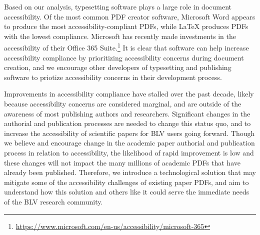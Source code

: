 Based on our analysis, typesetting software plays a large role in document accessibility. Of the most common PDF creator software, Microsoft Word appears to produce the most accessibility-compliant PDFs, while LaTeX produces PDFs with the lowest compliance. Microsoft has recently made investments in the accessibility of their Office 365 Suite.\footnote{\href{https://www.microsoft.com/en-us/accessibility/microsoft-365}{https://www.microsoft.com/en-us/accessibility/microsoft-365}} It is clear that software can help increase accessibility compliance by prioritizing accessibility concerns during document creation, and we encourage other developers of typesetting and publishing software to priotize accessibility concerns in their development process. 

Improvements in accessibility compliance have stalled over the past decade, likely because accessibility concerns are considered marginal, and are outside of the awareness of most publishing authors and researchers. Significant changes in the authorial and publication processes are needed to change this status quo, and to increase the accessibility of scientific papers for BLV users going forward. Though we believe and encourage change in the academic paper authorial and publication process in relation to accessibility, the likelihood of rapid improvement is low and these changes will not impact the many millions of academic PDFs that have already been published. Therefore, we introduce a technological solution that may mitigate some of the accessibility challenges of existing paper PDFs, and aim to understand how this solution and others like it could serve the immediate needs of the BLV research community.

